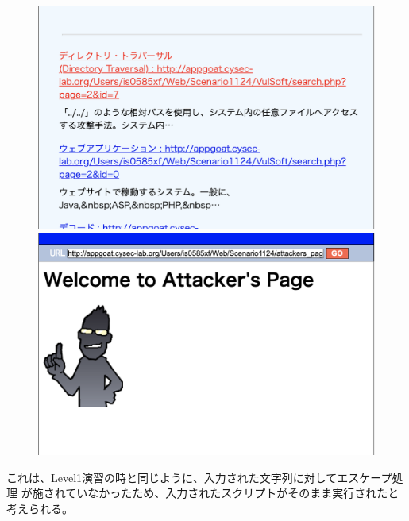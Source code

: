 \documentclass[dvipdfmx,autodetect-engine,titlepage]{jsarticle}
\begin{document}
\begin{figure}[h]
  \centering
  \begin{minipage}[b]{0.45\linewidth}
  \begin{center}
    \includegraphics[keepaspectratio,scale=0.35]{pic9.png}
    \end{center}
    \caption{}
  \end{minipage}
  \begin{minipage}[b]{0.45\linewidth}
  \begin{center}
    \includegraphics[keepaspectratio,scale=0.35]{pic10.png}
    \end{center}
    \caption{}
  \end{minipage}
\end{figure}

これは、Level1演習の時と同じように、入力された文字列に対してエスケープ処理
が施されていなかったため、入力されたスクリプトがそのまま実行されたと考えられる。
\end{document}
